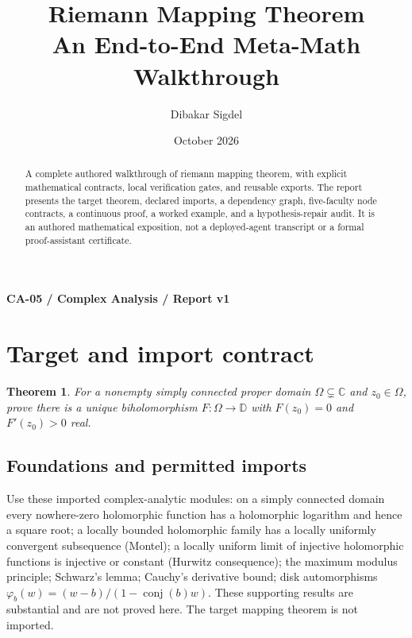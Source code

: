 \documentclass[preprint,12pt,aps,pra,showkeys,amsmath,amssymb,superscriptaddress,floatfix]{revtex4-2}
\newtheorem{theorem}{Theorem}[section]
\theoremstyle{definition}
\theoremstyle{remark}
\begin{document}
\title{Riemann Mapping Theorem\\[4pt]\large An End-to-End Meta-Math Walkthrough}

\author{Dibakar Sigdel}


\date{October 2026}

\begin{abstract}

A complete authored walkthrough of riemann mapping theorem, with
explicit mathematical contracts, local verification gates, and reusable
exports. The report presents the target theorem, declared imports, a
dependency graph, five-faculty node contracts, a continuous proof, a
worked example, and a hypothesis-repair audit. It is an authored
mathematical exposition, not a deployed-agent transcript or a formal
proof-assistant certificate.

\end{abstract}\maketitle\linespread{1.12}\selectfont

\noindent\textbf{CA-05 / Complex Analysis / Report v1}

\section{Target and import contract}

\begin{theorem}

For a nonempty simply connected proper domain
\(\Omega\subsetneq\mathbb C\) and \(z_0\in\Omega\), prove there is a
unique biholomorphism \(F:\Omega\to\mathbb D\) with \(F(z_0)=0\) and
\(F'(z_0)>0\) real.

\end{theorem}

\subsection{Foundations and permitted imports}

Use these imported complex-analytic modules: on a simply connected
domain every nowhere-zero holomorphic function has a holomorphic
logarithm and hence a square root; a locally bounded holomorphic family
has a locally uniformly convergent subsequence (Montel); a locally
uniform limit of injective holomorphic functions is injective or
constant (Hurwitz consequence); the maximum modulus principle; Schwarz's
lemma; Cauchy's derivative bound; disk automorphisms
\(\varphi _b(w)=(w-b)/(1-\operatorname{conj} (b)w)\). These supporting
results are substantial and are not proved here. The target mapping
theorem is not imported.
\end{document}
